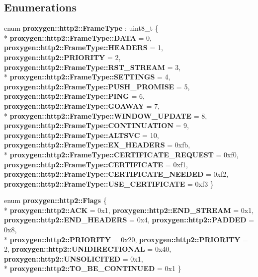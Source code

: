 \subsection*{Enumerations}
\begin{DoxyCompactItemize}
\item 
enum {\bf proxygen\+::http2\+::\+Frame\+Type} \+: uint8\+\_\+t \{ \\*
{\bf proxygen\+::http2\+::\+Frame\+Type\+::\+D\+A\+TA} = 0, 
{\bf proxygen\+::http2\+::\+Frame\+Type\+::\+H\+E\+A\+D\+E\+RS} = 1, 
{\bf proxygen\+::http2\+::\+P\+R\+I\+O\+R\+I\+TY} = 2, 
{\bf proxygen\+::http2\+::\+Frame\+Type\+::\+R\+S\+T\+\_\+\+S\+T\+R\+E\+AM} = 3, 
\\*
{\bf proxygen\+::http2\+::\+Frame\+Type\+::\+S\+E\+T\+T\+I\+N\+GS} = 4, 
{\bf proxygen\+::http2\+::\+Frame\+Type\+::\+P\+U\+S\+H\+\_\+\+P\+R\+O\+M\+I\+SE} = 5, 
{\bf proxygen\+::http2\+::\+Frame\+Type\+::\+P\+I\+NG} = 6, 
{\bf proxygen\+::http2\+::\+Frame\+Type\+::\+G\+O\+A\+W\+AY} = 7, 
\\*
{\bf proxygen\+::http2\+::\+Frame\+Type\+::\+W\+I\+N\+D\+O\+W\+\_\+\+U\+P\+D\+A\+TE} = 8, 
{\bf proxygen\+::http2\+::\+Frame\+Type\+::\+C\+O\+N\+T\+I\+N\+U\+A\+T\+I\+ON} = 9, 
{\bf proxygen\+::http2\+::\+Frame\+Type\+::\+A\+L\+T\+S\+VC} = 10, 
{\bf proxygen\+::http2\+::\+Frame\+Type\+::\+E\+X\+\_\+\+H\+E\+A\+D\+E\+RS} = 0xfb, 
\\*
{\bf proxygen\+::http2\+::\+Frame\+Type\+::\+C\+E\+R\+T\+I\+F\+I\+C\+A\+T\+E\+\_\+\+R\+E\+Q\+U\+E\+ST} = 0xf0, 
{\bf proxygen\+::http2\+::\+Frame\+Type\+::\+C\+E\+R\+T\+I\+F\+I\+C\+A\+TE} = 0xf1, 
{\bf proxygen\+::http2\+::\+Frame\+Type\+::\+C\+E\+R\+T\+I\+F\+I\+C\+A\+T\+E\+\_\+\+N\+E\+E\+D\+ED} = 0xf2, 
{\bf proxygen\+::http2\+::\+Frame\+Type\+::\+U\+S\+E\+\_\+\+C\+E\+R\+T\+I\+F\+I\+C\+A\+TE} = 0xf3
 \}
\item 
enum {\bf proxygen\+::http2\+::\+Flags} \{ \\*
{\bf proxygen\+::http2\+::\+A\+CK} = 0x1, 
{\bf proxygen\+::http2\+::\+E\+N\+D\+\_\+\+S\+T\+R\+E\+AM} = 0x1, 
{\bf proxygen\+::http2\+::\+E\+N\+D\+\_\+\+H\+E\+A\+D\+E\+RS} = 0x4, 
{\bf proxygen\+::http2\+::\+P\+A\+D\+D\+ED} = 0x8, 
\\*
{\bf proxygen\+::http2\+::\+P\+R\+I\+O\+R\+I\+TY} = 0x20, 
{\bf proxygen\+::http2\+::\+P\+R\+I\+O\+R\+I\+TY} = 2, 
{\bf proxygen\+::http2\+::\+U\+N\+I\+D\+I\+R\+E\+C\+T\+I\+O\+N\+AL} = 0x40, 
{\bf proxygen\+::http2\+::\+U\+N\+S\+O\+L\+I\+C\+I\+T\+ED} = 0x1, 
\\*
{\bf proxygen\+::http2\+::\+T\+O\+\_\+\+B\+E\+\_\+\+C\+O\+N\+T\+I\+N\+U\+ED} = 0x1
 \}
\end{DoxyCompactItemize}
